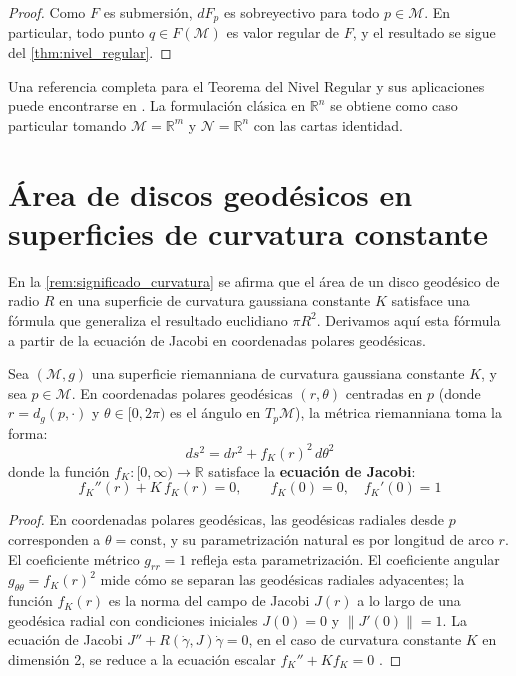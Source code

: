 \begin{proof}
Como $F$ es submersión, $dF_p$ es sobreyectivo para todo $p \in \mathcal{M}$. En particular, todo punto $q \in F(\mathcal{M})$ es valor regular de $F$, y el resultado se sigue del \autoref{thm:nivel_regular}.
\end{proof}

\begin{remark}
Una referencia completa para el Teorema del Nivel Regular y sus aplicaciones puede encontrarse en \citet[Capítulo~5, Teorema~5.12]{lee2012introduction}. La formulación clásica en $\mathbb{R}^n$ se obtiene como caso particular tomando $\mathcal{M} = \mathbb{R}^m$ y $\mathcal{N} = \mathbb{R}^n$ con las cartas identidad.
\end{remark}

\section[Área de discos geodésicos]{Área de discos geodésicos en superficies de curvatura constante}\label{sec:area_disco_geodesico}

En la \autoref{rem:significado_curvatura} se afirma que el área de un disco geodésico de radio $R$ en una superficie de curvatura gaussiana constante $K$ satisface una fórmula que generaliza el resultado euclidiano $\pi R^2$. Derivamos aquí esta fórmula a partir de la ecuación de Jacobi en coordenadas polares geodésicas.

\begin{proposition}\label{prop:metrica_polar_geodesica}
Sea $(\mathcal{M}, g)$ una superficie riemanniana de curvatura gaussiana constante $K$, y sea $p \in \mathcal{M}$. En coordenadas polares geodésicas $(r, \theta)$ centradas en $p$ (donde $r = d_g(p, \cdot)$ y $\theta \in [0, 2\pi)$ es el ángulo en $T_p\mathcal{M}$), la métrica riemanniana toma la forma:
\begin{equation}\label{eq:metrica_polar_geodesica}
ds^2 = dr^2 + f_K(r)^2 \, d\theta^2
\end{equation}
donde la función $f_K: [0, \infty) \to \mathbb{R}$ satisface la \textbf{ecuación de Jacobi}:
\begin{equation}\label{eq:jacobi_radial}
f_K''(r) + K \, f_K(r) = 0, \qquad f_K(0) = 0, \quad f_K'(0) = 1
\end{equation}
\end{proposition}

\begin{proof}
En coordenadas polares geodésicas, las geodésicas radiales desde $p$ corresponden a $\theta = \text{const}$, y su parametrización natural es por longitud de arco $r$. El coeficiente métrico $g_{rr} = 1$ refleja esta parametrización. El coeficiente angular $g_{\theta\theta} = f_K(r)^2$ mide cómo se separan las geodésicas radiales adyacentes; la función $f_K(r)$ es la norma del campo de Jacobi $J(r)$ a lo largo de una geodésica radial con condiciones iniciales $J(0) = 0$ y $\|J'(0)\| = 1$. La ecuación de Jacobi $J'' + R(\dot{\gamma}, J)\dot{\gamma} = 0$, en el caso de curvatura constante $K$ en dimensión 2, se reduce a la ecuación escalar $f_K'' + K f_K = 0$ \citep[Capítulo~10]{lee2018introduction}.
\end{proof}

